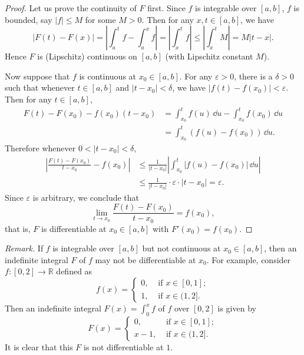 \begin{proof}
  Let us prove the continuity of $F$ first.
  Since $f$ is integrable over $[a,b]$, $f$ is bounded, say $|f| \leqslant M$ for some $M > 0$.
  Then for any $x,t \in [a,b]$, we have
  \[
    | F(t) - F(x) | = \left| \int_a^t f - \int_a^x f \right| = \left| \int_x^t f \right| \leqslant \left| \int_x^t M \right| = M |t-x|.
  \]
  Hence $F$ is (Lipschitz) continuous on $[a,b]$ (with Lipschitz constant $M$).

  Now suppose that $f$ is continuous at $x_0 \in [a,b]$.
  For any $\varepsilon > 0$, there is a $\delta > 0$ such that whenever $t \in [a,b]$ and $|t-x_0| < \delta$, we have $|f(t) - f(x_0)| < \varepsilon$. Then for any $t \in [a,b]$,
  \begin{align*}
    F(t) - F(x_0) - f(x_0) (t-x_0) &= \int_{x_0}^t f(u) \, \dd u - \int_{x_0}^t f(x_0) \, \dd u \\
    &= \int_{x_0}^t ( f(u) - f(x_0) ) \, \dd u.
  \end{align*}
  Therefore whenever $0 < |t-x_0| < \delta$,
  \begin{align*}
    \left| \frac{ F(t) - F(x_0) }{ t - x_0 } - f(x_0) \right| &\leqslant \frac{1}{|t-x_0|} \left| \int_{x_0}^t |f(u) - f(x_0)| \, \dd u \right| \\
    &\leqslant \frac{1}{|t-x_0|} \cdot \varepsilon \cdot |t-x_0| = \varepsilon.
  \end{align*}
  Since $\varepsilon$ is arbitrary, we conclude that
  \[
    \lim_{t \to x_0} \frac{ F(t) - F(x_0) }{ t - x_0 } = f(x_0),
  \]
  that is, $F$ is differentiable at $x_0 \in [a,b]$ with $F'(x_0) = f(x_0)$.
\end{proof}

\noindent\textit{Remark.} If $f$ is integrable over $[a,b]$ but not continuous at $x_0 \in [a,b]$, then an indefinite integral $F$ of $f$ may not be differentiable at $x_0$.
For example, consider $f: [0,2] \to \mathbb{R}$ defined as
\[
  f(x) = 
  \begin{cases}
    0, & \text{ if $x \in [0,1]$}; \\
    1, & \text{ if $x \in (1,2]$}.
  \end{cases}
\]
Then an indefinite integral $F(x) = \int_0^x f$ of $f$ over $[0,2]$ is given by
\[
  F(x) = 
  \begin{cases}
    0, & \text{ if $x \in [0,1]$}; \\
    x-1, & \text{ if $x \in (1,2]$}.
  \end{cases}
\]
It is clear that this $F$ is not differentiable at $1$.

